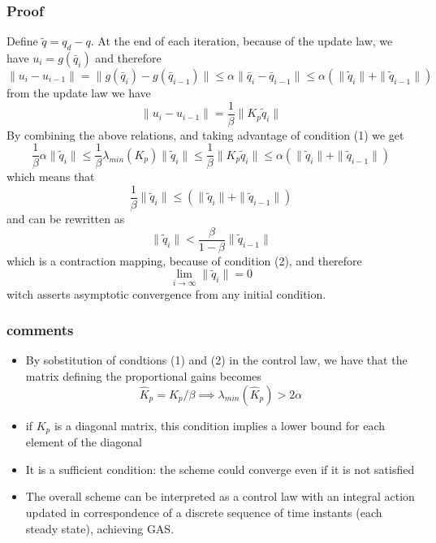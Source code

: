\documentclass{book}
\begin{document}
\subsubsection{Proof}
Define $\tilde{q}=q_d-q$. At the end of each iteration, because of the update law, we have $u_i=g(\bar{q}_i)$ and therefore 
\[
    \|u_i-u_{i-1}\| = \| g(\bar{q}_i)-g(\bar{q}_{i-1}) \| \leq \alpha\|\bar{q}_i-\bar{q}_{i-1}\| \leq \alpha(\|\tilde{q}_i\| + \|\tilde{q}_{i-1}\|)
\]
from the update law we have 
\[
    \|u_i-u_{i-1}\| = \displaystyle\frac{1}{\beta}\|K_p\tilde{q}_i\|
\]
By combining the above relations, and taking advantage of condition (1) we get 
\[
    \displaystyle\frac{1}{\beta}\alpha \|\tilde{q}_i\| \leq \displaystyle\frac{1}{\beta}\lambda_{min}(K_p)\|\tilde{q}_i\| \leq \displaystyle\frac{1}{\beta}\|K_p\tilde{q}_i\| \leq \alpha(\|\tilde{q}_i\|+\|\tilde{q}_{i-1}\|)
\]
which means that 
\[
    \displaystyle\frac{1}{\beta} \|\tilde{q}_i\| \leq (\|\tilde{q}_i\|+\|\tilde{q}_{i-1}\|)
\]
and can be rewritten as 
\[
    \|\tilde{q}_i\| < \displaystyle\frac{\beta}{1-\beta}\|\tilde{q}_{i-1}\|
\]
which is a contraction mapping, because of condition (2), and therefore 
\[
    \lim_{i\to\infty} \|\tilde{q}_i\|=0
\]
witch asserts asymptotic convergence from any initial condition. 
\subsubsection{comments}
\begin{itemize}
    \item By sobstitution of condtions (1) and (2) in the control law, we have that the matrix defining the proportional gains becomes 
        \[
            \hat{K}_p=K_p/\beta \implies \lambda_{min}(\hat{K}_p)>2\alpha
        \]
    \item if $K_p$ is a diagonal matrix, this condition implies a lower bound for each element of the diagonal 
    \item It is a sufficient condition: the scheme could converge even if it is not satisfied 
    \item The overall scheme can be interpreted as a control law with an integral action updated in correspondence of a discrete sequence of time instants (each steady state), achieving GAS.
\end{itemize}
\end{document}
